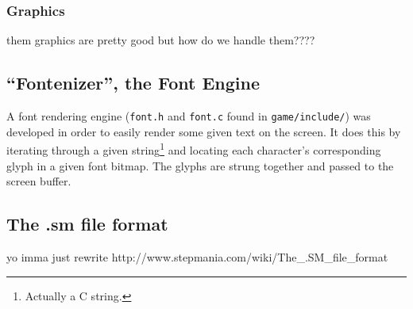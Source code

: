 	\subsubsection{Graphics}
		them graphics are pretty good but how do we handle them????
\subsection{``Fontenizer'', the Font Engine}
	A font rendering engine (\texttt{font.h} and \texttt{font.c} found in \texttt{game/include/}) was developed in order to easily render some given text on the screen.
	It does this by iterating through a given string\footnote{Actually a C string.} and locating each character's corresponding glyph in a given font bitmap.
	The glyphs are strung together and passed to the screen buffer.

\subsection{The .sm file format}
	yo imma just rewrite http://www.stepmania.com/wiki/The_.SM_file_format